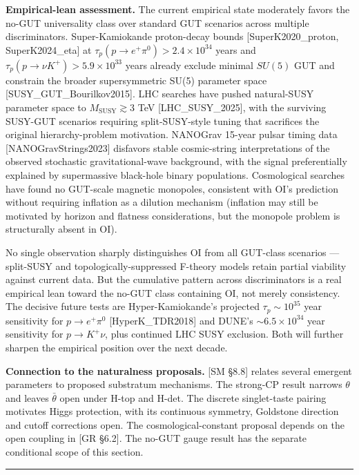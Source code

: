 \documentclass[
]{article}
\begin{document}
\textbf{Empirical-lean assessment.} The current empirical state
moderately favors the no-GUT universality class over standard GUT
scenarios across multiple discriminators. Super-Kamiokande proton-decay
bounds {[}SuperK2020\_proton, SuperK2024\_eta{]} at
\(\tau_p(p \to e^+\pi^0) > 2.4 \times 10^{34}\) years and
\(\tau_p(p \to \nu K^+) > 5.9 \times 10^{33}\) years already exclude
minimal \(SU(5)\) GUT and constrain the broader supersymmetric SU(5)
parameter space {[}SUSY\_GUT\_Bourilkov2015{]}. LHC searches have pushed
natural-SUSY parameter space to \(M_{\mathrm{SUSY}} \gtrsim 3\) TeV
{[}LHC\_SUSY\_2025{]}, with the surviving SUSY-GUT scenarios requiring
split-SUSY-style tuning that sacrifices the original hierarchy-problem
motivation. NANOGrav 15-year pulsar timing data
{[}NANOGravStrings2023{]} disfavors stable cosmic-string interpretations
of the observed stochastic gravitational-wave background, with the
signal preferentially explained by supermassive black-hole binary
populations. Cosmological searches have found no GUT-scale magnetic
monopoles, consistent with OI's prediction without requiring inflation
as a dilution mechanism (inflation may still be motivated by horizon and
flatness considerations, but the monopole problem is structurally absent
in OI).

No single observation sharply distinguishes OI from all GUT-class
scenarios --- split-SUSY and topologically-suppressed F-theory models
retain partial viability against current data. But the cumulative
pattern across discriminators is a real empirical lean toward the no-GUT
class containing OI, not merely consistency. The decisive future tests
are Hyper-Kamiokande's projected \(\tau_p \sim 10^{35}\) year
sensitivity for \(p \to e^+\pi^0\) {[}HyperK\_TDR2018{]} and DUNE's
\(\sim 6.5 \times 10^{34}\) year sensitivity for \(p \to K^+\nu\), plus
continued LHC SUSY exclusion. Both will further sharpen the empirical
position over the next decade.

\textbf{Connection to the naturalness proposals.} {[}SM §8.8{]} relates
several emergent parameters to proposed substratum mechanisms. The
strong-CP result narrows \(\theta\) and leaves \(\bar\theta\) open under
H-top and H-det. The discrete singlet-taste pairing motivates Higgs
protection, with its continuous symmetry, Goldstone direction and cutoff
corrections open. The cosmological-constant proposal depends on the open
coupling in {[}GR §6.2{]}. The no-GUT gauge result has the separate
conditional scope of this section.

\begin{center}\rule{0.5\linewidth}{0.5pt}\end{center}
\end{document}
